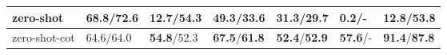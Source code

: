 \begin{table}[t]
\begin{tabular}{p{}p{}p{}p{}p{}p{}p{}}
zero-shot &\textbf{68.8}/\textbf{72.6} &12.7/\textbf{54.3} &49.3/33.6 &31.3/29.7 &0.2/- &12.8/53.8 \\
\midrule
zero-shot-cot &64.6/64.0 &\textbf{54.8}/52.3&\textbf{67.5}/\textbf{61.8} &\textbf{52.4}/\textbf{52.9} &\textbf{57.6}/- &\textbf{91.4}/\textbf{87.8} \\
\bottomrule
\end{tabular}

\label{tab:main_results}
\end{table}